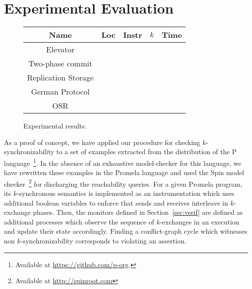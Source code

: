 \section{Experimental Evaluation}

\begin{wrapfigure}{l}{5.7cm}
\vspace{-8mm}
{\small
\begin{tabular}{|c|c|c|c|c|}
\hline
Name & Loc & Instr & $k$ & Time \\
\hline
Elevator&  \\
\hline
Two-phase commit &  \\
\hline
Replication Storage& \\
\hline
German Protocol &  \\
\hline
OSR &  \\
\hline
\end{tabular}
}
\caption{Experimental results.}
\label{fig:experiments}
\end{wrapfigure}
As a proof of concept, we have applied our procedure for checking $k$-synchronizability to a set of examples extracted from the distribution of the P language~\footnote{Available at \url{https://github.com/p-org}.}. In the absence of an exhaustive model-checker for this language, we have rewritten these examples in the Promela language and used the Spin model checker~\footnote{Available at \url{http://spinroot.com}} for discharging the reachability queries. For a given Promela program, its $k$-synchronous semantics is implemented as an instrumentation which uses additional boolean variables to enforce that sends and receives interleave in $k$-exchange phases. Then, the monitors defined in Section~\ref{sec:verif} are defined as additional processes which observe the sequence of $k$-exchanges in an execution and update their state accordingly. Finding a conflict-graph cycle which witnesses non $k$-synchronizability corresponds to violating an assertion.
